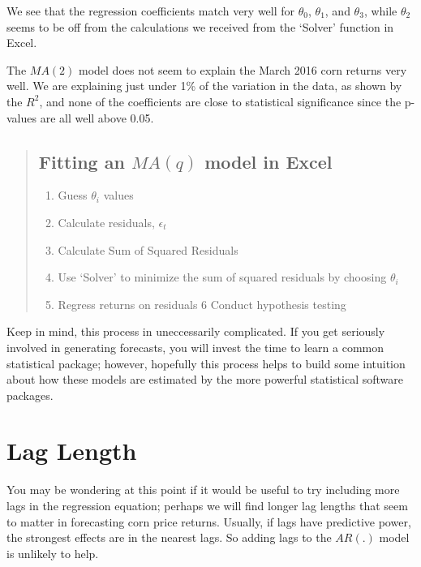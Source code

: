 \documentclass[]{book}
\providecommand{\tightlist}{%
  \setlength{\itemsep}{0pt}\setlength{\parskip}{0pt}}
\theoremstyle{definition}
\theoremstyle{definition}
\theoremstyle{remark}
\begin{document}
We see that the regression coefficients match very well for
\(\theta_0\), \(\theta_1\), and \(\theta_3\), while \(\theta_2\) seems
to be off from the calculations we received from the `Solver' function
in Excel.

The \(MA(2)\) model does not seem to explain the March 2016 corn returns
very well. We are explaining just under 1\% of the variation in the
data, as shown by the \(R^2\), and none of the coefficients are close to
statistical significance since the p-values are all well above 0.05.

\begin{quote}
\subsection{\texorpdfstring{Fitting an \(MA(q)\) model in
Excel}{Fitting an MA(q) model in Excel}}\label{fitting-an-maq-model-in-excel}

\begin{enumerate}
\def\labelenumi{\arabic{enumi}.}
\tightlist
\item
  Guess \(\theta_i\) values
\item
  Calculate residuals, \(\epsilon_t\)
\item
  Calculate Sum of Squared Residuals
\item
  Use `Solver' to minimize the sum of squared residuals by choosing
  \(\theta_i\)
\item
  Regress returns on residuals 6 Conduct hypothesis testing
\end{enumerate}
\end{quote}

Keep in mind, this process in uneccessarily complicated. If you get
seriously involved in generating forecasts, you will invest the time to
learn a common statistical package; however, hopefully this process
helps to build some intuition about how these models are estimated by
the more powerful statistical software packages.

\section{Lag Length}\label{lag-length}

You may be wondering at this point if it would be useful to try
including more lags in the regression equation; perhaps we will find
longer lag lengths that seem to matter in forecasting corn price
returns. Usually, if lags have predictive power, the strongest effects
are in the nearest lags. So adding lags to the \(AR(.)\) model is
unlikely to help.
\end{document}
